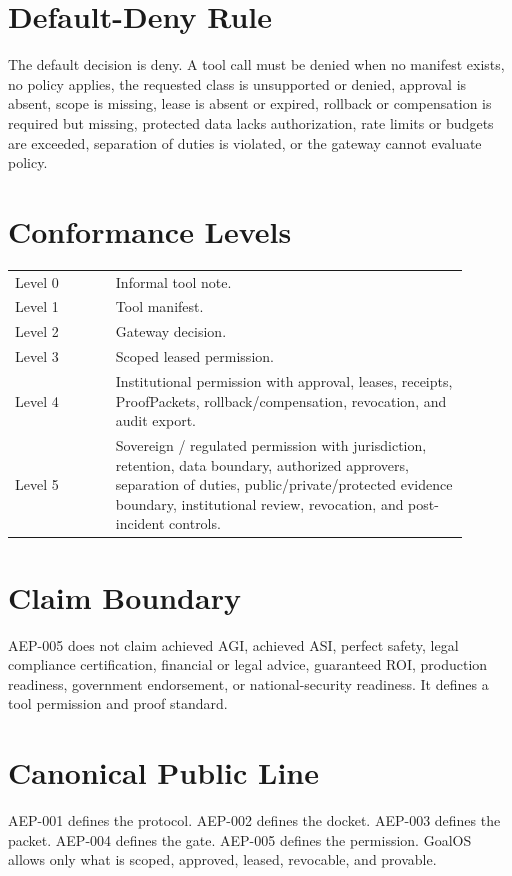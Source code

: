 \documentclass[11pt]{article}
\begin{document}
\section{Default-Deny Rule}
The default decision is deny. A tool call must be denied when no manifest exists, no policy applies, the requested class is unsupported or denied, approval is absent, scope is missing, lease is absent or expired, rollback or compensation is required but missing, protected data lacks authorization, rate limits or budgets are exceeded, separation of duties is violated, or the gateway cannot evaluate policy.

\section{Conformance Levels}
\begin{longtable}{p{0.20\linewidth}p{0.70\linewidth}}
Level 0 & Informal tool note.\\
Level 1 & Tool manifest.\\
Level 2 & Gateway decision.\\
Level 3 & Scoped leased permission.\\
Level 4 & Institutional permission with approval, leases, receipts, ProofPackets, rollback/compensation, revocation, and audit export.\\
Level 5 & Sovereign / regulated permission with jurisdiction, retention, data boundary, authorized approvers, separation of duties, public/private/protected evidence boundary, institutional review, revocation, and post-incident controls.\\
\end{longtable}

\section{Claim Boundary}
AEP-005 does not claim achieved AGI, achieved ASI, perfect safety, legal compliance certification, financial or legal advice, guaranteed ROI, production readiness, government endorsement, or national-security readiness. It defines a tool permission and proof standard.

\section*{Canonical Public Line}
AEP-001 defines the protocol. AEP-002 defines the docket. AEP-003 defines the packet. AEP-004 defines the gate. AEP-005 defines the permission. GoalOS allows only what is scoped, approved, leased, revocable, and provable.
\end{document}
